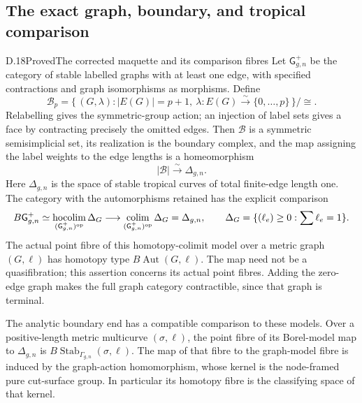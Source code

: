 \subsection{The exact graph, boundary, and tropical comparison}

\begin{result}{D.18}{Proved}{The corrected maquette and its comparison fibres}
Let $\mathsf G_{g,n}^{+}$ be the category of stable labelled graphs with at least one edge, with specified contractions and graph isomorphisms as morphisms. Define
\[
 \mathcal B_p=
 \{\,(G,\lambda):|E(G)|=p+1,\ 
       \lambda:E(G)\xrightarrow{\sim}\{0,\ldots,p\}\,\}/\cong .
\]
Relabelling gives the symmetric-group action; an injection of label sets gives a face by contracting precisely the omitted edges. Then $\mathcal B$ is a symmetric semisimplicial set, its realization is the boundary complex, and the map assigning the label weights to the edge lengths is a homeomorphism
\[
 |\mathcal B|\xrightarrow{\sim}\Delta_{g,n}.
\]
Here $\Delta_{g,n}$ is the space of stable tropical curves of total finite-edge length one. The category with the automorphisms retained has the explicit comparison
\[
 B\mathsf G_{g,n}^{+}\simeq
 \operatorname*{hocolim}_{(\mathsf G_{g,n}^{+})^{\rm op}}\Delta_G
 \longrightarrow
 \operatorname*{colim}_{(\mathsf G_{g,n}^{+})^{\rm op}}\Delta_G
 =\Delta_{g,n},\qquad
 \Delta_G=\{(\ell_e)\geq0:\sum\ell_e=1\}.
\]
The actual point fibre of this homotopy-colimit model over a metric graph $(G,\ell)$ has homotopy type $B\operatorname{Aut}(G,\ell)$. The map need not be a quasifibration; this assertion concerns its actual point fibres. Adding the zero-edge graph makes the full graph category contractible, since that graph is terminal.

The analytic boundary end has a compatible comparison to these models. Over a positive-length metric multicurve $(\sigma,\ell)$, the point fibre of its Borel-model map to $\Delta_{g,n}$ is
$B\operatorname{Stab}_{\Gamma_{g,n}}(\sigma,\ell)$.
The map of that fibre to the graph-model fibre is induced by the graph-action homomorphism, whose kernel is the node-framed pure cut-surface group. In particular its homotopy fibre is the classifying space of that kernel.
\end{result}
